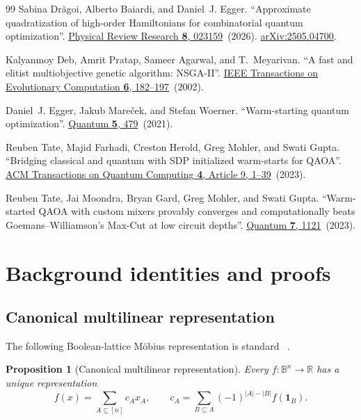 \documentclass[a4paper,onecolumn,11pt,unpublished]{quantumarticle}
\newtheorem{proposition}[proposition]{Proposition}
\theoremstyle{remark}
\begin{document}
\begin{thebibliography}{99}
Sabina Dr{\u a}goi, Alberto Baiardi, and Daniel~J. Egger.
\newblock ``Approximate quadratization of high-order Hamiltonians for combinatorial quantum optimization''.
\newblock \href{https://dx.doi.org/10.1103/9rc4-vj11}{Physical Review Research {\bf 8}, 023159}~(2026).
\newblock \href{http://arxiv.org/abs/2505.04700}{arXiv:2505.04700}.

Kalyanmoy Deb, Amrit Pratap, Sameer Agarwal, and T.~Meyarivan.
\newblock ``A fast and elitist multiobjective genetic algorithm: NSGA-II''.
\newblock \href{https://dx.doi.org/10.1109/4235.996017}{IEEE Transactions on Evolutionary Computation {\bf 6}, 182--197}~(2002).

Daniel~J. Egger, Jakub Mare{\v c}ek, and Stefan Woerner.
\newblock ``Warm-starting quantum optimization''.
\newblock \href{https://dx.doi.org/10.22331/q-2021-06-17-479}{Quantum {\bf 5}, 479}~(2021).

Reuben Tate, Majid Farhadi, Creston Herold, Greg Mohler, and Swati Gupta.
\newblock ``Bridging classical and quantum with SDP initialized warm-starts for QAOA''.
\newblock \href{https://dx.doi.org/10.1145/3549554}{ACM Transactions on Quantum Computing {\bf 4}, Article 9, 1--39}~(2023).

Reuben Tate, Jai Moondra, Bryan Gard, Greg Mohler, and Swati Gupta.
\newblock ``Warm-started QAOA with custom mixers provably converges and computationally beats Goemans--Williamson's Max-Cut at low circuit depths''.
\newblock \href{https://dx.doi.org/10.22331/q-2023-09-26-1121}{Quantum {\bf 7}, 1121}~(2023).

\end{thebibliography}


\clearpage
\appendix
\section{Background identities and proofs}
\label{app:background-identities}

\subsection{Canonical multilinear representation}
\label{app:canonical-pb}

The following Boolean-lattice M\"obius representation is standard
~\cite{BorosHammer2002,Hadfield2021}.
\begin{proposition}[Canonical multilinear representation]
Every \(f:\mathbb{B}^n\to\mathbb{R}\) has a unique representation
\begin{equation}
  f(x)=\sum_{A\subseteq[n]}c_Ax_A,
  \qquad
  c_A=\sum_{B\subseteq A}(-1)^{|A|-|B|}f(\mathbf{1}_B).
  \label{eq:app-mobius}
\end{equation}
\end{proposition}
\end{document}

